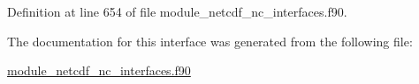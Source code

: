 Definition at line 654 of file module\+\_\+netcdf\+\_\+nc\+\_\+interfaces.\+f90.



The documentation for this interface was generated from the following file\+:\begin{DoxyCompactItemize}
\item 
\hyperlink{module__netcdf__nc__interfaces_8f90}{module\+\_\+netcdf\+\_\+nc\+\_\+interfaces.\+f90}\end{DoxyCompactItemize}
